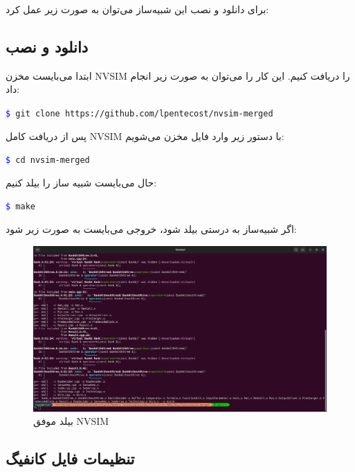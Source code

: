 \documentclass[12pt]{exam}
\begin{document}
\begin{questions}
برای دانلود و نصب این شبیه‌ساز می‌توان به صورت زیر عمل کرد:

\subsection{دانلود و نصب}

ابتدا می‌بایست مخزن NVSIM را دریافت کنیم. این کار را می‌توان به صورت زیر انجام داد: \\

\begin{latin}
	\texttt{\textcolor{blue}{\$} git clone https://github.com/lpentecost/nvsim-merged} \\
\end{latin}

پس از دریافت کامل NVSIM با دستور زیر وارد فایل مخزن می‌شویم: \\

\begin{latin}
	\texttt{\textcolor{blue}{\$} cd nvsim-merged} \\
\end{latin}

حال می‌بایست شبیه ساز را بیلد کنیم: \\

\begin{latin}
	\texttt{\textcolor{blue}{\$} make} \\
\end{latin}

اگر شبیه‌ساز به درستی بیلد شود، خروجی می‌بایست به صورت زیر شود:

\begin{figure}[h]
	\centering
	\includegraphics[width=1\textwidth]{images/img6}
	\caption{بیلد موفق NVSIM}
	\label{بیلد موفق NVSIM}
\end{figure}


\subsection{تنظیمات فایل کانفیگ}


\end{questions}
\end{document}
